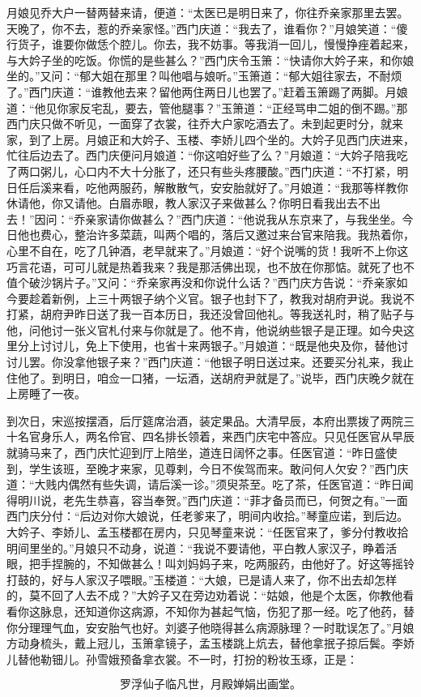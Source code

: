 月娘见乔大户一替两替来请，便道：“太医已是明日来了，你往乔亲家那里去罢。天晚了，你不去，惹的乔亲家怪。”西门庆道：“我去了，谁看你？”月娘笑道：“傻行货子，谁要你做恁个腔儿。你去，我不妨事。等我消一回儿，慢慢挣痤着起来，与大妗子坐的吃饭。你慌的是些甚么？”西门庆令玉箫：“快请你大妗子来，和你娘坐的。”又问：“郁大姐在那里？叫他唱与娘听。”玉箫道：“郁大姐往家去，不耐烦了。”西门庆道：“谁教他去来？留他两住两日儿也罢了。”赶着玉箫踢了两脚。月娘道：“他见你家反宅乱，要去，管他腿事？”玉箫道：“正经骂申二姐的倒不踢。”那西门庆只做不听见，一面穿了衣裳，往乔大户家吃酒去了。未到起更时分，就来家，到了上房。月娘正和大妗子、玉楼、李娇儿四个坐的。大妗子见西门庆进来，忙往后边去了。西门庆便问月娘道：“你这咱好些了么？”月娘道：“大妗子陪我吃了两口粥儿，心口内不大十分胀了，还只有些头疼腰酸。”西门庆道：“不打紧，明日任后溪来看，吃他两服药，解散散气，安安胎就好了。”月娘道：“我那等样教你休请他，你又请他。白眉赤眼，教人家汉子来做甚么？你明日看我出去不出去！”因问：“乔亲家请你做甚么？”西门庆道：“他说我从东京来了，与我坐坐。今日他也费心，整治许多菜蔬，叫两个唱的，落后又邀过来台官来陪我。我热着你，心里不自在，吃了几钟酒，老早就来了。”月娘道：“好个说嘴的货！我听不上你这巧言花语，可可儿就是热着我来？我是那活佛出现，也不放在你那惦。就死了也不值个破沙锅片子。”又问：“乔亲家再没和你说什么话？”西门庆方告说：“乔亲家如今要趁着新例，上三十两银子纳个义官。银子也封下了，教我对胡府尹说。我说不打紧，胡府尹昨日送了我一百本历日，我还没曾回他礼。等我送礼时，稍了贴子与他，问他讨一张义官札付来与你就是了。他不肯，他说纳些银子是正理。如今央这里分上讨讨儿，免上下使用，也省十来两银子。”月娘道：“既是他央及你，替他讨讨儿罢。你没拿他银子来？”西门庆道：“他银子明日送过来。还要买分礼来，我止住他了。到明日，咱佥一口猪，一坛酒，送胡府尹就是了。”说毕，西门庆晚夕就在上房睡了一夜。

到次日，宋巡按摆酒，后厅筵席治酒，装定果品。大清早辰，本府出票拨了两院三十名官身乐人，两名伶官、四名排长领着，来西门庆宅中答应。只见任医官从早辰就骑马来了，西门庆忙迎到厅上陪坐，道连日阔怀之事。任医官道：“昨日盛使到，学生该班，至晚才来家，见尊剌，今日不俟驾而来。敢问何人欠安？”西门庆道：“大贱内偶然有些失调，请后溪一诊。”须臾茶至。吃了茶，任医官道：“昨日闻得明川说，老先生恭喜，容当奉贺。”西门庆道：“菲才备员而已，何贺之有。”一面西门庆分付：“后边对你大娘说，任老爹来了，明间内收拾。”琴童应诺，到后边。大妗子、李娇儿、孟玉楼都在房内，只见琴童来说：“任医官来了，爹分付教收拾明间里坐的。”月娘只不动身，说道：“我说不要请他，平白教人家汉子，睁着活眼，把手捏腕的，不知做甚么！叫刘妈妈子来，吃两服药，由他好了。好这等摇铃打鼓的，好与人家汉子喂眼。”玉楼道：“大娘，已是请人来了，你不出去却怎样的，莫不回了人去不成？”大妗子又在旁边劝着说：“姑娘，他是个太医，你教他看看你这脉息，还知道你这病源，不知你为甚起气恼，伤犯了那一经。吃了他药，替你分理理气血，安安胎气也好。刘婆子他晓得甚么病源脉理？一时耽误怎了。”月娘方动身梳头，戴上冠儿，玉箫拿镜子，孟玉楼跳上炕去，替他拿抿子掠后鬓。李娇儿替他勒钿儿。孙雪娥预备拿衣裳。不一时，打扮的粉妆玉琢，正是：

\[
罗浮仙子临凡世，月殿婵娟出画堂。
\]

